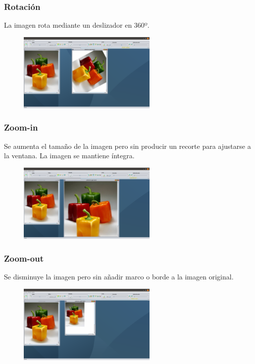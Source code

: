 \documentclass[11pt,a4paper]{article}
\begin{document}
\subsubsection{Rotación}
La imagen rota mediante un deslizador en 360º.

\begin{figure}[H]
\centering
	\includegraphics[width=0.6\textwidth]{img/rotar.png}
\end{figure}

\subsubsection{Zoom-in}
Se aumenta el tamaño de la imagen pero sin producir un recorte para ajustarse a la ventana. La imagen se mantiene íntegra.

\begin{figure}[H]
\centering
	\includegraphics[width=0.6\textwidth]{img/escalamas.png}
\end{figure}

\subsubsection{Zoom-out}
Se disminuye la imagen pero sin añadir marco o borde a la imagen original.

\begin{figure}[H]
\centering
	\includegraphics[width=0.6\textwidth]{img/escalamenos.png}
\end{figure}
\end{document}

